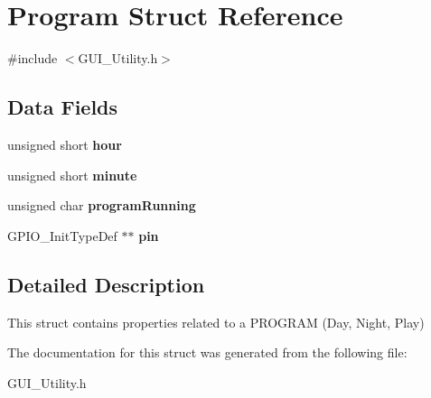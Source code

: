 \hypertarget{struct_program}{}\section{Program Struct Reference}
\label{struct_program}


{\ttfamily \#include $<$G\+U\+I\+\_\+\+Utility.\+h$>$}

\subsection*{Data Fields}
\begin{DoxyCompactItemize}
\item 
\mbox{\label{struct_program_a37d8b371665ba806eb351bdbba23559c}} 
unsigned short {\bfseries hour}
\item 
\mbox{\label{struct_program_a6ef87e28aee6ea7b44fb6ad1b811d6a7}} 
unsigned short {\bfseries minute}
\item 
\mbox{\label{struct_program_ad86678a787b6ef9f3b4290a36f7d6e7c}} 
unsigned char {\bfseries program\+Running}
\item 
\mbox{\label{struct_program_a6f9860c6fa5493d9bd0f7983f7b2314a}} 
G\+P\+I\+O\+\_\+\+Init\+Type\+Def $\ast$$\ast$ {\bfseries pin}
\end{DoxyCompactItemize}


\subsection{Detailed Description}
This struct contains properties related to a P\+R\+O\+G\+R\+AM (Day, Night, Play) 

The documentation for this struct was generated from the following file\+:\begin{DoxyCompactItemize}
\item 
G\+U\+I\+\_\+\+Utility.\+h\end{DoxyCompactItemize}
